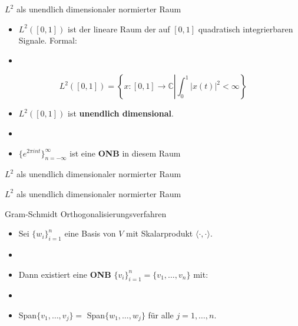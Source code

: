 \documentclass[14pt, aspectratio=169, handout]{beamer}
\begin{document}
\begin{frame}{$L^2$ als unendlich dimensionaler normierter Raum}
    \begin{itemize}
        \item $L^2([0,1])$ ist der lineare Raum der auf $[0,1]$ quadratisch integrierbaren Signale. Formal:
        \item[] 
    \end{itemize}
    $$L^2\left( [0,1] \right) = \left\{ x: [0,1] \to \mathbb{C} \left| \int_0^1 |x(t)|^2 < \infty \right. \right\}$$
    \begin{itemize}
        \item $L^2([0,1])$ ist \textbf{unendlich dimensional}.
        \item[] 
        \item $\{e^{2 \pi i n t}\}_{n = -\infty}^\infty$ ist eine \textbf{ONB} in diesem Raum
    \end{itemize}
\end{frame}

\begin{frame}{$L^2$ als unendlich dimensionaler normierter Raum}
    
\end{frame}

\begin{frame}{$L^2$ als unendlich dimensionaler normierter Raum}
    
\end{frame}

\begin{frame}{Gram-Schmidt Orthogonalisierungsverfahren}
    \begin{itemize}
        \item Sei $\{ w_i \}_{i=1}^n $ eine Basis von $V$ mit Skalarprodukt $\langle \cdot, \cdot \rangle$.
        \item[] 
        \item[] Dann existiert eine \textbf{ONB} $\{v_i\}_{i=1}^n = \{v_1, \dots, v_n\}$ mit:
        \item[] 
        \item[] Span$\{v_1, \dots, v_j\} = $ Span$\{w_1, \dots, w_j\}$ für alle $j = 1, \dots, n$.
    \end{itemize}
\end{frame}
\end{document}
